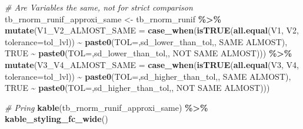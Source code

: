 \documentclass[
]{book}
\newenvironment{Shaded}{\begin{snugshade}}{\end{snugshade}}
\newcommand{\CommentTok}[1]{\textcolor[rgb]{0.56,0.35,0.01}{\textit{#1}}}
\newcommand{\DataTypeTok}[1]{\textcolor[rgb]{0.13,0.29,0.53}{#1}}
\newcommand{\KeywordTok}[1]{\textcolor[rgb]{0.13,0.29,0.53}{\textbf{#1}}}
\newcommand{\NormalTok}[1]{#1}
\newcommand{\OperatorTok}[1]{\textcolor[rgb]{0.81,0.36,0.00}{\textbf{#1}}}
\newcommand{\OtherTok}[1]{\textcolor[rgb]{0.56,0.35,0.01}{#1}}
\newcommand{\StringTok}[1]{\textcolor[rgb]{0.31,0.60,0.02}{#1}}
\begin{document}
\begin{Shaded}
\begin{Highlighting}[]
\CommentTok{\# Are Variables the same, not for strict comparison}
\NormalTok{tb\_rnorm\_runif\_approxi\_same \textless{}{-}}\StringTok{ }\NormalTok{tb\_rnorm\_runif }\OperatorTok{\%\textgreater{}\%}
\StringTok{  }\KeywordTok{mutate}\NormalTok{(}\DataTypeTok{V1\_V2\_ALMOST\_SAME =} 
           \KeywordTok{case\_when}\NormalTok{(}\KeywordTok{isTRUE}\NormalTok{(}\KeywordTok{all.equal}\NormalTok{(V1, V2, }\DataTypeTok{tolerance=}\NormalTok{tol\_lvl)) }\OperatorTok{\textasciitilde{}}\StringTok{ }
\StringTok{                       }\KeywordTok{paste0}\NormalTok{(}\StringTok{\textquotesingle{}TOL=\textquotesingle{}}\NormalTok{,sd\_lower\_than\_tol,}\StringTok{\textquotesingle{}, SAME ALMOST\textquotesingle{}}\NormalTok{),}
                     \OtherTok{TRUE} \OperatorTok{\textasciitilde{}}\StringTok{ }
\StringTok{                       }\KeywordTok{paste0}\NormalTok{(}\StringTok{\textquotesingle{}TOL=\textquotesingle{}}\NormalTok{,sd\_lower\_than\_tol,}\StringTok{\textquotesingle{}, NOT SAME ALMOST\textquotesingle{}}\NormalTok{))) }\OperatorTok{\%\textgreater{}\%}
\StringTok{  }\KeywordTok{mutate}\NormalTok{(}\DataTypeTok{V3\_V4\_ALMOST\_SAME =}
           \KeywordTok{case\_when}\NormalTok{(}\KeywordTok{isTRUE}\NormalTok{(}\KeywordTok{all.equal}\NormalTok{(V3, V4, }\DataTypeTok{tolerance=}\NormalTok{tol\_lvl)) }\OperatorTok{\textasciitilde{}}\StringTok{ }
\StringTok{                       }\KeywordTok{paste0}\NormalTok{(}\StringTok{\textquotesingle{}TOL=\textquotesingle{}}\NormalTok{,sd\_higher\_than\_tol,}\StringTok{\textquotesingle{}, SAME ALMOST\textquotesingle{}}\NormalTok{),}
                     \OtherTok{TRUE} \OperatorTok{\textasciitilde{}}\StringTok{ }
\StringTok{                       }\KeywordTok{paste0}\NormalTok{(}\StringTok{\textquotesingle{}TOL=\textquotesingle{}}\NormalTok{,sd\_higher\_than\_tol,}\StringTok{\textquotesingle{}, NOT SAME ALMOST\textquotesingle{}}\NormalTok{)))}

\CommentTok{\# Pring}
\KeywordTok{kable}\NormalTok{(tb\_rnorm\_runif\_approxi\_same) }\OperatorTok{\%\textgreater{}\%}\StringTok{ }\KeywordTok{kable\_styling\_fc\_wide}\NormalTok{()}
\end{Highlighting}
\end{Shaded}
\end{document}
